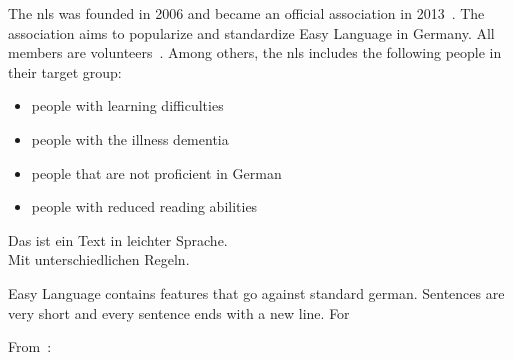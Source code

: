 The \gls{nls} was founded in 2006 and became an official association in 2013~\autocite{netzwerkHistory}.
The association aims to popularize and standardize Easy Language in Germany.
All members are volunteers~\autocite{netzwerkGoals}.
Among others, the \gls{nls} includes the following people in their target group:
\begin{itemize}[noitemsep]
    \item people with learning difficulties
    \item people with the illness dementia
    \item people that are not proficient in German
    \item people with reduced reading abilities
\end{itemize}








\begin{center}
    \colorbox{gray!20}{
        \begin{minipage}{0.9\textwidth}
            Das ist ein Text in leichter Sprache.\\
            Mit unterschiedlichen Regeln.
        \end{minipage}
    }
\end{center}

Easy Language contains features that go against standard german.
Sentences are very short and every sentence ends with a new line.
For


From~\autocite{easyLanguageBook}:


%
%
%
%
%
%
%

